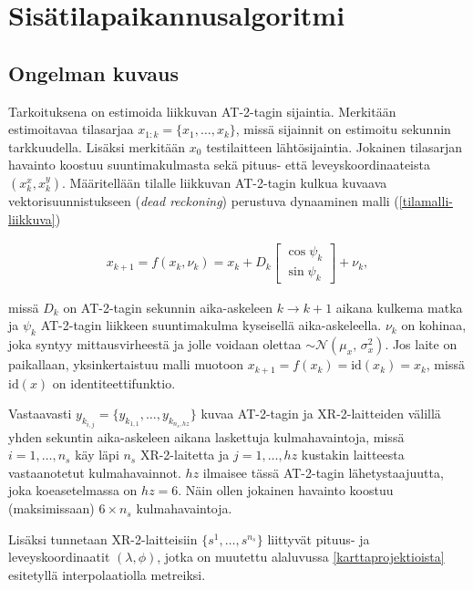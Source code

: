 \documentclass[
  12pt,
  a4paper, twoside]{book}
\begin{document}
\section{Sisätilapaikannusalgoritmi}

\subsection{Ongelman kuvaus} \label{ongelman-kuvaus}

Tarkoituksena on estimoida liikkuvan AT-2-tagin sijaintia. Merkitään estimoitavaa tilasarjaa \(x_{1:k}=\{x_1,\ldots,x_k\}\), missä sijainnit on estimoitu sekunnin tarkkuudella. Lisäksi merkitään \(x_0\) testilaitteen lähtösijaintia. Jokainen tilasarjan havainto koostuu suuntimakulmasta sekä pituus- että leveyskoordinaateista \((x_k^x, x_k^y)\). Määritellään tilalle liikkuvan AT-2-tagin kulkua kuvaava vektorisuunnistukseen (\emph{dead reckoning}) perustuva dynaaminen malli (\ref{tilamalli-liikkuva})

\begin{align}\label{tilamalli-liikkuva}
x_{k+1}=f(x_k, \nu_k)=x_k+D_k \begin{bmatrix} \cos\psi_k \\ \sin\psi_k \end{bmatrix}+\nu_k,
\end{align}

\noindent missä \(D_k\) on AT-2-tagin sekunnin aika-askeleen \(k \rightarrow k+1\) aikana kulkema matka ja \(\psi_k\) AT-2-tagin liikkeen suuntimakulma kyseisellä aika-askeleella. \(\nu_k\) on kohinaa, joka syntyy mittausvirheestä ja jolle voidaan olettaa \(\sim \mathcal{N}(\mu_x,\,\sigma_x^{2})\). Jos laite on paikallaan, yksinkertaistuu malli muotoon \(x_{k+1}=f(x_k)=\text{id}(x_k)=x_k\), missä \(\text{id}(x)\) on identiteettifunktio.

Vastaavasti \(y_{k_{i,j}}=\{y_{k_{1,1}},\ldots,y_{k_{n_s,hz}}\}\) kuvaa AT-2-tagin ja XR-2-laitteiden välillä yhden sekuntin aika-askeleen aikana laskettuja kulmahavaintoja, missä \(i=1,\ldots,n_s\) käy läpi \(n_s\) XR-2-laitetta ja \(j=1,\ldots,hz\) kustakin laitteesta vastaanotetut kulmahavainnot. \(hz\) ilmaisee tässä AT-2-tagin lähetystaajuutta, joka koeasetelmassa on \(hz=6\). Näin ollen jokainen havainto koostuu (maksimissaan) \(6\times n_s\) kulmahavaintoja.

\noindent Lisäksi tunnetaan XR-2-laitteisiin \(\{s^1,\ldots,s^{n_s}\}\) liittyvät pituus- ja leveyskoordinaatit \((\lambda, \phi)\), jotka on muutettu alaluvussa \ref{karttaprojektioista} esitetyllä interpolaatiolla metreiksi.
\end{document}
